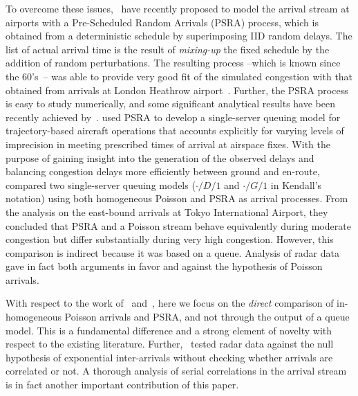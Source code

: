 \documentclass[draft,review]{elsarticle}
\begin{document}
To overcome these issues,~\citet{guadagni2011queueing} have recently proposed to model the arrival stream at airports with a Pre-Scheduled Random Arrivals (\ac{PSRA}) process, which is obtained from a deterministic schedule by superimposing \ac{IID} random delays.
The list of actual arrival time is the result of \emph{mixing-up} the fixed schedule by the addition of random perturbations.
The resulting process --which is known since the 60's~\citep{Kendall1964}-- was able to provide very good fit of the simulated congestion with that obtained from arrivals at London Heathrow airport~\citep{caccavale2014model}.
Further, the \ac{PSRA} process is easy to study numerically, and some significant analytical results have been recently achieved by~\citet{lancia2013advances}.
\citet{nikoleris2012queueing} used \ac{PSRA} to develop a single-server queuing model for trajectory-based aircraft operations that accounts explicitly for varying levels of imprecision in meeting prescribed times of arrival at airspace fixes.
With the purpose of gaining insight into the generation of the observed delays and balancing congestion delays more efficiently between ground and en-route, \citet{gwiggner2014data} compared two single-server queuing models (\(\cdot/D/1\) and \(\cdot/G/1\) in Kendall's notation) using both homogeneous Poisson and \ac{PSRA} as arrival processes.
From the analysis on the east-bound arrivals at Tokyo International Airport, they concluded that \ac{PSRA} and a Poisson stream behave equivalently during moderate congestion but differ substantially during very high congestion.
However, this comparison is indirect because it was based on a queue.
Analysis of radar data gave in fact both arguments in favor and against the hypothesis of Poisson arrivals.

With respect to the work of~\citep{caccavale2014model} and~\citet{gwiggner2014data}, here we focus on the \emph{direct} comparison of in-homogeneous Poisson arrivals and PSRA, and not through the output of a queue model.
This is a fundamental difference and a strong element of novelty with respect to the existing literature.
Further,~\citet{gwiggner2014data} tested radar data against the null hypothesis of exponential inter-arrivals without checking whether arrivals are correlated or not.
A thorough analysis of serial correlations in the arrival stream is in fact another important contribution of this paper.
\end{document}
